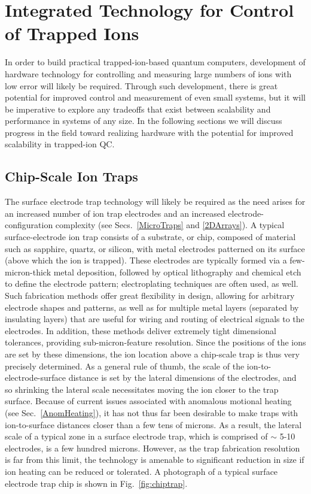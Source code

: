 \documentclass[%
reprint,
 amsmath,amssymb,
]{revtex4-1}
\begin{document}
\section{Integrated Technology for Control of Trapped Ions}
\label{ScalableHardware}
In order to build practical trapped-ion-based quantum computers, development of hardware technology for controlling and measuring large numbers of ions with low error will likely be required.  Through such development, there is great potential for improved control and measurement of even small systems, but it will be imperative to explore any tradeoffs that exist between scalability and performance in systems of any size.  In the following sections we will discuss progress in the field toward realizing hardware with the potential for improved scalability in trapped-ion QC.

    \subsection{Chip-Scale Ion Traps}
The surface electrode trap technology will likely be required as the need arises for an increased number of ion trap electrodes and an increased electrode-configuration complexity (see Secs.~\ref{MicroTraps} and \ref{2DArrays}).  A typical surface-electrode ion trap consists of a substrate, or chip, composed of material such as sapphire, quartz, or silicon, with metal electrodes patterned on its surface (above which the ion is trapped).  These electrodes are typically formed via a few-micron-thick metal deposition, followed by optical lithography and chemical etch to define the electrode pattern; electroplating techniques are often used, as well.  Such fabrication methods offer great flexibility in design, allowing for arbitrary electrode shapes and patterns, as well as for multiple metal layers (separated by insulating layers) that are useful for wiring and routing of electrical signals to the electrodes.  In addition, these methods deliver extremely tight dimensional tolerances, providing sub-micron-feature resolution.  Since the positions of the ions are set by these dimensions, the ion location above a chip-scale trap is thus very precisely determined.  As a general rule of thumb, the scale of the ion-to-electrode-surface distance is set by the lateral dimensions of the electrodes, and so shrinking the lateral scale necessitates moving the ion closer to the trap surface.  Because of current issues associated with anomalous motional heating (see Sec.~\ref{AnomHeating}), it has not thus far been desirable to make traps with ion-to-surface distances closer than a few tens of microns.  As a result, the lateral scale of a typical zone in a surface electrode trap, which is comprised of $\sim$ 5-10 electrodes, is a few hundred microns.  However, as the trap fabrication resolution is far from this limit, the technology is amenable to significant reduction in size if ion heating can be reduced or tolerated.  A photograph of a typical surface electrode trap chip is shown in Fig.~\ref{fig:chiptrap}.
\end{document}
